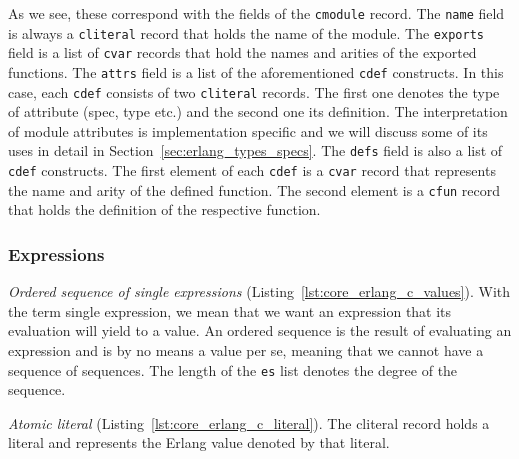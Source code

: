 As we see, these correspond with the fields of the \texttt{c\textunderscore module} record. The \texttt{name}
field is always a \texttt{c\textunderscore literal} record that holds the name of the module. The
\texttt{exports} field is a list of \texttt{c\textunderscore var} records that hold the names and arities of the
exported functions. The \texttt{attrs} field is a list of the aforementioned
\texttt{c\textunderscore def} constructs. In this case, each \texttt{c\textunderscore def} consists of two
\texttt{c\textunderscore literal} records. The first one denotes the type of
attribute (spec, type etc.) and the second one
its definition. The interpretation of module attributes is implementation
specific and we will discuss some of its uses in detail in Section~\ref{sec:erlang_types_specs}. The
\texttt{defs} field is also a list of \texttt{c\textunderscore def} constructs. The
first element of each \texttt{c\textunderscore def} is a \texttt{c\textunderscore var} record
that represents the name and arity of the defined function. The second element
is a \texttt{c\textunderscore fun} record that holds the definition of the respective
function.

\subsubsection{Expressions}


\emph{Ordered sequence of single expressions} (Listing~\ref{lst:core_erlang_c_values}).
With the term single expression, we mean that we want an expression that its
evaluation will yield to a value. An ordered sequence is the result of
evaluating an expression and is by no means a value per se, meaning that we
cannot have a sequence of sequences. The length of the \texttt{es} list denotes the
degree of the sequence.


\emph{Atomic literal} (Listing~\ref{lst:core_erlang_c_literal}).
The c\textunderscore literal record holds a  literal and represents the Erlang value denoted
by that literal.



